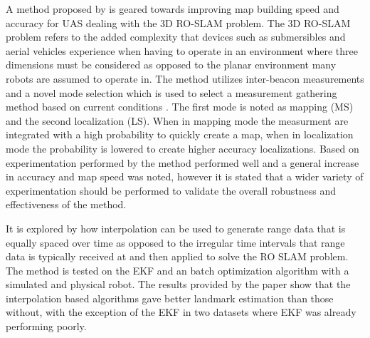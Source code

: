 \documentclass[conference]{IEEEtran}
\begin{document}
	
	
	
	
	
	A method proposed by \cite{Dios2015} is geared towards improving map building speed and accuracy for UAS dealing with the 3D RO-SLAM problem. The 3D RO-SLAM problem refers to the added complexity that devices such as submersibles \cite{Newman} and aerial vehicles experience when having to operate in an environment where three dimensions must be considered as opposed to the planar environment many robots are assumed to operate in. The method utilizes inter-beacon measurements and a novel mode selection which is used to select a measurement gathering method based on current conditions \cite{Dios2015}. The first mode is noted as mapping (MS) and the second localization (LS). When in mapping mode the measurment are integrated with a high probability to quickly create a map, when in localization mode the probability is lowered to create higher accuracy localizations. Based on experimentation performed by \cite{Dios2015} the method performed well and a general increase in accuracy and map speed was noted, however it is stated that a wider variety of experimentation should be performed to validate the overall robustness and effectiveness of the method.
	
	
	
	
	It is explored by \cite{Kehagias2006} how interpolation can be used to generate range data that is equally spaced over time as opposed to the irregular time intervals that range data is typically received at and then applied to solve the RO SLAM problem. The method is tested on the EKF and an batch optimization algorithm with a simulated and physical robot. The results provided by the paper show that the interpolation based algorithms gave better landmark estimation than those without, with the exception of the EKF in two datasets where EKF was already performing poorly.
	
	
	
	
	
\end{document}
